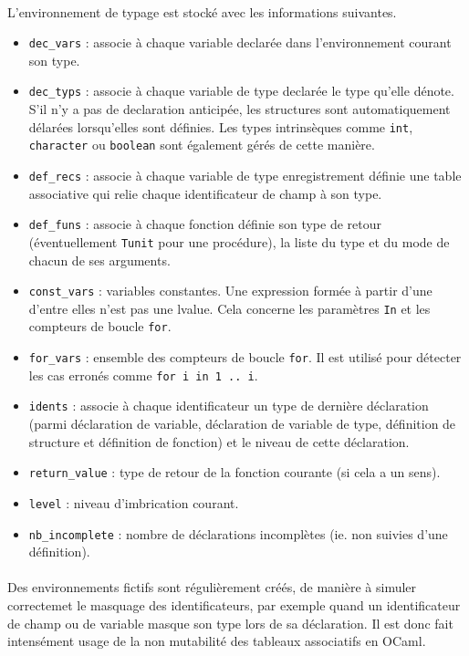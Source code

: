 \documentclass[a4paper,12pt]{article}
\begin{document}
\paragraph*{}
L'environnement de typage est stocké avec les informations suivantes.
\begin{itemize}
\item \texttt{dec\_vars} : associe à chaque variable declarée dans l'environnement courant son type.
\item \texttt{dec\_typs} : associe à chaque variable de type declarée le type qu'elle dénote. S'il n'y a pas de declaration anticipée, les structures sont automatiquement délarées lorsqu'elles sont définies. Les types intrinsèques comme \texttt{int}, \texttt{character} ou \texttt{boolean} sont également gérés de cette manière.
\item \texttt{def\_recs} : associe à chaque variable de type enregistrement définie une table associative qui relie chaque identificateur de champ à son type.
\item \texttt{def\_funs} : associe à chaque fonction définie son type de retour (éventuellement \texttt{Tunit} pour une procédure), la liste du type et du mode de chacun de ses arguments.
\item \texttt{const\_vars} : variables constantes. Une expression formée à partir d'une d'entre elles n'est pas une lvalue. Cela concerne les paramètres \texttt{In} et les compteurs de boucle \texttt{for}.
\item \texttt{for\_vars} : ensemble des compteurs de boucle \texttt{for}. Il est utilisé pour détecter les cas erronés comme \texttt{for i in 1 .. i}. 
\item \texttt{idents} : associe à chaque identificateur un type de dernière déclaration (parmi déclaration de variable, déclaration de variable de type, définition de structure et définition de fonction) et le niveau de cette déclaration.
\item \texttt{return\_value} : type de retour de la fonction courante (si cela a un sens).
\item \texttt{level} : niveau d'imbrication courant.
\item \texttt{nb\_incomplete} : nombre de déclarations incomplètes (ie. non suivies d'une définition).
\end{itemize}

\paragraph*{}
Des environnements fictifs sont régulièrement créés, de manière à simuler correctemet le masquage des identificateurs, par exemple quand un identificateur de champ ou de variable masque son type lors de sa déclaration. Il est donc fait intensément usage de la non mutabilité des tableaux associatifs en OCaml. 
\end{document}

